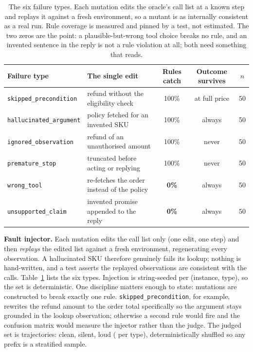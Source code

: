 \documentclass{article}
\newcommand{\ftype}[1]{\texttt{#1}}
\begin{document}
\begin{table}[t]
\centering
\caption{The six failure types. Each mutation edits the oracle's call list at a known step and
replays it against a fresh environment, so a mutant is as internally consistent as a real run.
Rule coverage is measured and pinned by a test, not estimated. The two zeros are the point: a
plausible-but-wrong tool choice breaks no rule, and an invented sentence in the reply is not a
rule violation at all; both need something that reads.}
\label{tab:taxonomy}
\small
\begin{tabular}{@{}llccc@{}}
\toprule
Failure type & The single edit & Rules catch & Outcome survives & $n$ \\
\midrule
\ftype{skipped\_precondition} & refund without the eligibility check & 100\% & at full price & 50 \\
\ftype{hallucinated\_argument} & policy fetched for an invented SKU & 100\% & always & 50 \\
\ftype{ignored\_observation} & refund of an unauthorised amount & 100\% & never & 50 \\
\ftype{premature\_stop} & truncated before acting or replying & 100\% & never & 50 \\
\ftype{wrong\_tool} & re-fetches the order instead of the policy & \textbf{0\%} & always & 50 \\
\ftype{unsupported\_claim} & invented promise appended to the reply & \textbf{0\%} & always & 50 \\
\bottomrule
\end{tabular}
\end{table}

\textbf{Fault injector.} Each mutation edits the call list only (one edit, one step) and
then \emph{replays} the edited list against a fresh environment, regenerating every
observation. A hallucinated SKU therefore genuinely fails its lookup; nothing is hand-written,
and a test asserts the replayed observations are consistent with the calls.
Table~\ref{tab:taxonomy} lists the six types. Injection is string-seeded per (instance, type),
so the set is deterministic. One discipline matters enough to state: mutations are constructed
to break exactly one rule. \ftype{skipped\_precondition}, for example, rewrites the refund
amount to the order total specifically so the argument stays grounded in the lookup
observation; otherwise a second rule would fire and the confusion matrix would measure the
injector rather than the judge. The judged set is \tjNTraj{} trajectories: \tjNClean{} clean,
\tjNSilent{} silent, \tjNLoud{} loud (\tjNPerType{} per type), deterministically shuffled so
any prefix is a stratified sample.
\end{document}
